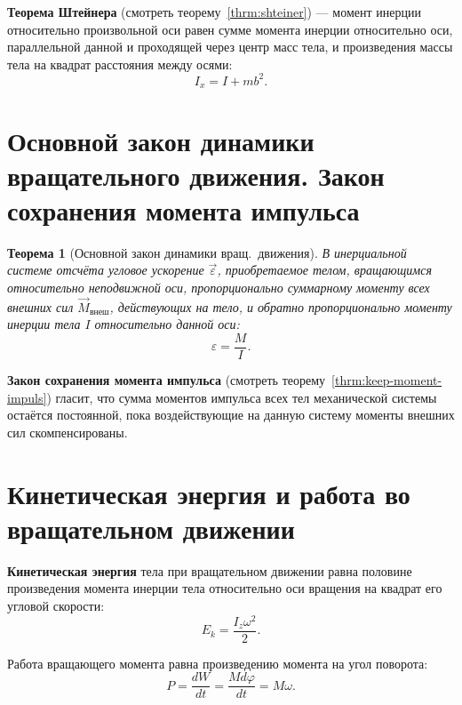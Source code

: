 \documentclass[10pt]{scrbook}
\newtheorem{theorem}{Теорема}[section]
\begin{document}
\textbf{Теорема Штейнера} (смотреть теорему~\ref{thrm:shteiner}) — момент
инерции относительно произвольной оси равен сумме момента инерции относительно
оси, параллельной данной и проходящей через центр масс тела, и произведения
массы тела на квадрат расстояния между осями: \[
	I_x = I + mb^2
	.\]

\section[восьмой вопрос]{Основной закон динамики вращательного движения. Закон
  сохранения момента импульса}

\begin{theorem}[Основной закон динамики вращ.~движения]
	В инерциальной системе отсчёта угловое ускорение $\vec{\varepsilon}$,
	приобретаемое телом, вращающимся относительно неподвижной оси,
	пропорционально суммарному моменту всех внешних сил $\vec{M}_\text{внеш}$,
	действующих на тело, и обратно пропорционально моменту инерции тела $I$
	относительно данной оси: \[
		\varepsilon = \frac{M}{I}
		.\]
\end{theorem}

\textbf{Закон сохранения момента импульса} (смотреть
теорему~\ref{thrm:keep-moment-impuls}) гласит, что сумма моментов импульса всех
тел механической системы остаётся постоянной, пока воздействующие на данную
систему моменты внешних сил скомпенсированы.

\section[девятый вопрос]{Кинетическая энергия и работа во вращательном
  движении}

\textbf{Кинетическая энергия} тела при вращательном движении равна половине
произведения момента инерции тела относительно оси вращения на квадрат его
угловой скорости: \[
	E_k = \frac{I_z \omega^2}{2}
	.\]

Работа вращающего момента равна произведению момента на угол поворота: \[
	P = \frac{dW}{dt} = \frac{M d\varphi}{dt} = M \omega
	.\]
\end{document}
